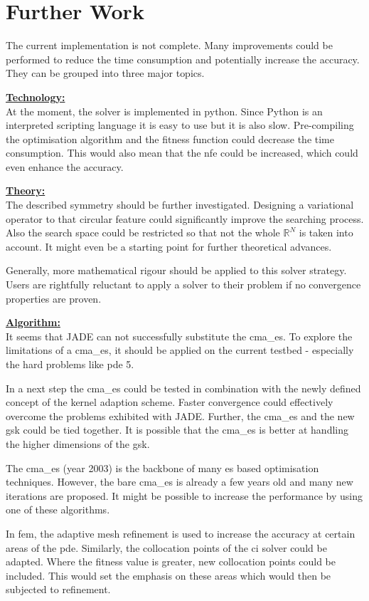\documentclass[./\jobname.tex]{subfiles}
\begin{document}
\chapter{Further Work}

The current implementation is not complete. Many improvements could be performed to reduce the time consumption and potentially increase the accuracy. They can be grouped into three major topics.  

\underline{\textbf{Technology:}} \\
At the moment, the solver is implemented in python. Since Python is an interpreted scripting language it is easy to use but it is also slow. Pre-compiling the optimisation algorithm and the fitness function could decrease the time consumption. This would also mean that the \gls{nfe} could be increased, which could even enhance the accuracy.

\underline{\textbf{Theory:}}\\
The described symmetry should be further investigated. Designing a variational operator to that circular feature could significantly improve the searching process. Also the search space could be restricted so that not the whole $\mathbb{R}^N$ is taken into account. It might even be a starting point for further theoretical advances.

Generally, more mathematical rigour should be applied to this solver strategy. Users are rightfully reluctant to apply a solver to their problem if no convergence properties are proven. 

\underline{\textbf{Algorithm:}}\\
It seems that JADE can not successfully substitute the \gls{cma_es}. To explore the limitations of a \gls{cma_es}, it should be applied on the current testbed - especially the hard problems like \gls{pde} 5. 

In a next step the \gls{cma_es} could be tested in combination with the newly defined concept of the kernel adaption scheme. Faster convergence could effectively overcome the problems exhibited with JADE. Further, the \gls{cma_es} and the new \gls{gsk} could be tied together. It is possible that the \gls{cma_es} is better at handling the higher dimensions of the \gls{gsk}. 

The \gls{cma_es} (year 2003) is the backbone of many \gls{es} based optimisation techniques. However, the bare \gls{cma_es} is already a few years old and many new iterations are proposed. It might be possible to increase the performance by using one of these algorithms. 

In \gls{fem}, the adaptive mesh refinement is used to increase the accuracy at certain areas of the \gls{pde}. Similarly, the collocation points of the \gls{ci} solver could be adapted. Where the fitness value is greater, new collocation points could be included. This would set the emphasis on these areas which would then be subjected to refinement. 
\end{document}
